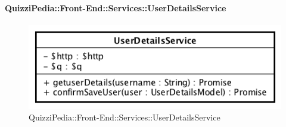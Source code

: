 \paragraph{QuizziPedia::Front-End::Services::UserDetailsService}
\begin{figure}[ht]
	\centering
	\includegraphics[scale=0.60]{UML/Classi/Front-End/QuizziPedia_Front-end_Services_UserDetailsService.png}
	\caption{QuizziPedia::Front-End::Services::UserDetailsService}
\end{figure}\FloatBarrier

